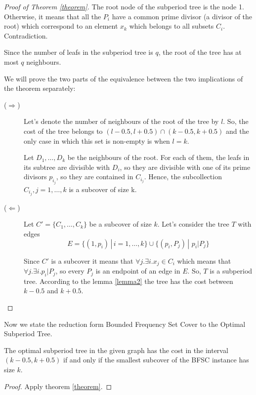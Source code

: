 \begin{proof}[Proof of Theorem \ref{theorem}]
The root node of the subperiod tree is the node 1. Otherwise, it means that all the $P_i$ have a common prime divisor (a divisor of the root) which correspond to an element $x_k$ which belongs to all subsets $C_i$. Contradiction.

Since the number of leafs in the subperiod tree is $q$, the root of the tree has at most $q$ neighbours.

We will prove the two parts of the equivalence between the two implications of the theorem separately:

\begin{description}
\item[($\Rightarrow$)] 
Let's denote the number of neighbours of the root of the tree by $l$. So, the cost of the tree belongs to $(l-0.5, l+0.5)\cap (k-0.5,k+0.5)$ and the only case in which this set is non-empty is when $l=k$.

Let $D_1, \ldots, D_k$ be the neighbours of the root. For each of them, the leafs in its subtree are divisible with $D_i$, so they are divisible with one of its prime divisors $p_{i_j}$, so they are contained in $C_{i_j}$. Hence, the subcollection $C_{i_j},j=1,\ldots,k$ is a subcover of size k.

\item[($\Leftarrow$)] Let $C'=\{C_1,\ldots,C_k\}$ be a subcover of size $k$. Let's consider the tree $T$ with edges 
$$E = \{(1, p_i) \,|\, i=1,\ldots, k\} \cup \{(p_i, P_j) \,| \,\, p_i | P_j\}$$

Since $C'$ is a subcover it means that $\forall j. \exists i. x_j \in C_i$ which means that $\forall j. \exists i. p_i \vert P_j$, so every $P_j$ is an endpoint of an edge in $E$. So, $T$ is a subperiod tree. According to the lemma \ref{lemma2} the tree has the cost between $k-0.5$ and $k+0.5$.

\end{description}\end{proof}

Now we state the reduction form Bounded Frequency Set Cover to the Optimal Subperiod Tree.
\begin{theorem}
The optimal subperiod tree in the given graph has the cost in the interval $(k-0.5, k+0.5)$ if and only if the smallest subcover of the BFSC instance has size $k$.
\end{theorem}

\begin{proof}
Apply theorem \ref{theorem}.
\end{proof}

